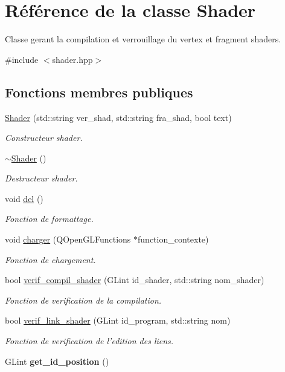 \hypertarget{classShader}{\section{Référence de la classe Shader}
\label{classShader}
}


Classe gerant la compilation et verrouillage du vertex et fragment shaders.  




{\ttfamily \#include $<$shader.\+hpp$>$}

\subsection*{Fonctions membres publiques}
\begin{DoxyCompactItemize}
\item 
\hyperlink{classShader_a1bad1e19019e86f5491eb7490e0ec204}{Shader} (std\+::string ver\+\_\+shad, std\+::string fra\+\_\+shad, bool text)
\begin{DoxyCompactList}\small\item\em Constructeur shader. \end{DoxyCompactList}\item 
\hyperlink{classShader_aff01df87e8a102f270b5b135a295e59d}{$\sim$\+Shader} ()
\begin{DoxyCompactList}\small\item\em Destructeur shader. \end{DoxyCompactList}\item 
void \hyperlink{classShader_ad6fe36e8abe4842214b604467ae653c4}{del} ()
\begin{DoxyCompactList}\small\item\em Fonction de formattage. \end{DoxyCompactList}\item 
void \hyperlink{classShader_a41eeb2d28f161e822e09b8471ceb1bad}{charger} (Q\+Open\+G\+L\+Functions $\ast$function\+\_\+contexte)
\begin{DoxyCompactList}\small\item\em Fonction de chargement. \end{DoxyCompactList}\item 
bool \hyperlink{classShader_a2ecd01e476085e7e53d8d2d0ffb45944}{verif\+\_\+compil\+\_\+shader} (G\+Lint id\+\_\+shader, std\+::string nom\+\_\+shader)
\begin{DoxyCompactList}\small\item\em Fonction de verification de la compilation. \end{DoxyCompactList}\item 
bool \hyperlink{classShader_af019e34beca44951ef6245fcdfc0daae}{verif\+\_\+link\+\_\+shader} (G\+Lint id\+\_\+program, std\+::string nom)
\begin{DoxyCompactList}\small\item\em Fonction de verification de l'edition des liens. \end{DoxyCompactList}\item 
\hypertarget{classShader_a2f22c874367a2a1df32772ae53687810}{G\+Lint {\bfseries get\+\_\+id\+\_\+position} ()}\label{classShader_a2f22c874367a2a1df32772ae53687810}


\end{DoxyCompactItemize}
